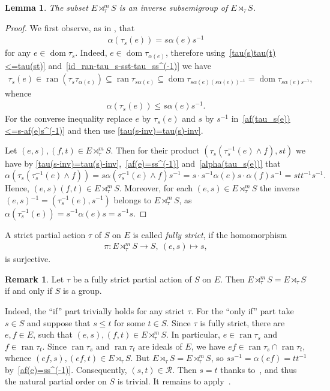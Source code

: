 \documentclass[reqno]{amsart}
\newtheorem{lem}[thrm]{Lemma}
\theoremstyle{definition}
\newtheorem{rem}[thrm]{Remark}
\newcommand{\cR}{\mathcal R}
\newcommand{\dom}[1]{\operatorname{\mathrm{dom}}{#1}}
\newcommand{\ran}[1]{\operatorname{\mathrm{ran}}{#1}}
\newcommand{\m}{{}^{-1}}
\newcommand{\0}{\theta}
\newcommand{\mt}{\wedge}
\newcommand{\rt}{\rtimes}
\begin{document}
\begin{lem}\label{L_m(E-tau-S)-inv-sem}
	The subset $E\rt^m_\tau S$ is an inverse subsemigroup of $E\rt_\tau S$.
\end{lem}
\begin{proof}
	We first observe, as in \cite[Lemma 2]{O'Carroll77}, that 
	\begin{align}\label{alpha(tau_s(e))}
	\alpha(\tau_s(e))=s\alpha(e)s\m  
	\end{align}
	for any $e\in\dom{\tau_s}$. Indeed, $e\in\dom{\tau_{\alpha(e)}}$, therefore using~\ref{tau(s)tau(t)<=tau(st)} and~\eqref{id_ran-tau_s-sst-tau_ss^(-1)} we have
	\begin{align*}
	\tau_s(e)\in\ran{(\tau_s\tau_{\alpha(e)})}\subseteq\ran{\tau_{s\alpha(e)}}\subseteq\dom{\tau_{s\alpha(e)(s\alpha(e))\m}}=\dom{\tau_{s\alpha(e)s\m}},
	\end{align*}
	whence
	\begin{align}\label{af(tau_s(e))<=s-af(e)s^(-1)}
	\alpha(\tau_s(e))\le s\alpha(e)s\m.
	\end{align}
	For the converse inequality replace $e$ by $\tau_s(e)$ and $s$ by $s\m$ in~\eqref{af(tau_s(e))<=s-af(e)s^(-1)} and then use \ref{tau(s-inv)=tau(s)-inv}.
	
	Let $(e,s),(f,t)\in E\rt^m_\tau S$. Then for their product $(\tau_s(\tau\m_s(e)\mt f),st)$ we have by \ref{tau(s-inv)=tau(s)-inv},~\eqref{af(e)=ss^(-1)} and~\eqref{alpha(tau_s(e))} that
	$$
	\alpha(\tau_s(\tau\m_s(e)\mt f))=s\alpha(\tau\m_s(e)\mt f)s\m=s\cdot s\m\alpha(e)s\cdot\alpha(f)s\m=stt\m s\m.
	$$
	Hence, $(e,s)(f,t)\in E\rt^m_\tau S$. Moreover, for each $(e,s)\in E\rt^m_\tau S$ the inverse $(e,s)\m=(\tau\m_s(e),s\m)$ belongs to $E\rt^m_\tau S$, as $\alpha(\tau\m_s(e))=s\m\alpha(e)s=s\m s$.
\end{proof}

A strict partial action $\tau$ of $S$ on $E$ is called {\it fully strict}, if the homomorphism 
\begin{align}\label{pi(e_s)-mapsto-s}
\pi:E\rt^m_\tau S\to S,\ (e,s)\mapsto s,
\end{align}
is surjective.

\begin{rem}\label{L_m=L-iff-S-group}
	Let $\tau$ be a fully strict partial action of $S$ on $E$. Then $E\rt^m_\tau S=E\rt_\tau S$ if and only if $S$ is a group.
\end{rem}
\noindent Indeed, the ``if'' part trivially holds for any strict $\tau$. For the ``only if'' part take $s\in S$ and suppose that $s\le t$ for some $t\in S$. Since $\tau$ is fully strict, there are $e,f\in E$, such that $(e,s),(f,t)\in E\rt^m_\tau S$. In particular, $e\in\ran{\tau_s}$ and $f\in\ran{\tau_t}$. Since $\ran{\tau_s}$ and $\ran{\tau_t}$ are ideals of $E$, we have $ef\in\ran{\tau_s}\cap\ran{\tau_t}$, whence $(ef,s),(ef,t)\in E\rt_\tau S$. But $E\rt_\tau S=E\rt^m_\tau S$, so $ss\m=\alpha(ef)=tt\m$ by~\eqref{af(e)=ss^(-1)}. Consequently, $(s,t)\in\cR$. Then $s=t$ thanks to~\cite[Proposition~3.2.3 (2)]{Lawson}, and thus the natural partial order on $S$ is trivial. It remains to apply~\cite[Proposition~1.4.10]{Lawson}.
\end{document}
